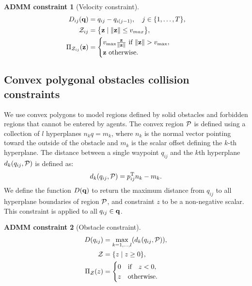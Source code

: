 \documentclass[journal]{IEEEtran}  %
\newtheorem{constraint}{ADMM constraint}
\def\sZ{\mathcal{Z}}
\begin{document}
  \begin{constraint}[Velocity constraint]
\begin{align}
     D_{ij}(\vq) &= q_{ij}-q_{i(j-1)}, \quad j\in\{1,\ldots, T\},\\
\label{eq:velocity_constraint}
   \sZ_{ij} &=\bigl\{\vz \mid \norm{\vz} \leq v_{max}\bigr\},\\
   \Pi_{\sZ_{ij}}(\vz)&=\begin{cases}
   v_{\max}\frac{\vz}{\norm{\vz}} \textrm{ if } \norm{\vz}>v_{\max},\\
   \vz\textrm{ otherwise.}
   \end{cases}
\end{align}
\end{constraint}

\subsection{Convex polygonal obstacles collision constraints} \label{sec:obstacle-constraint}

We use convex polygons to model regions defined by solid obstacles and forbidden regions that cannot be entered by agents. The convex region $\mathcal{P}$ is defined using a collection of $l$ hyperplanes $n_{k} q = m_{k}$, where $n_k$ is the normal vector pointing toward the outside of the obstacle and $m_k$ is the scalar offset defining the $k$-th hyperplane. The distance between a single waypoint $q_{ij}$ and the $k$th hyperplane $d_{k}(q_{ij},\mathcal{P})$ is defined as:
\begin{equation}
    d_{k}(q_{ij},\mathcal{P})= p_{ij}^\mathrm{T} n_k - m_k.
\end{equation}
We define the function $D(\mathbf{q})$ to return the maximum distance from $q_{ij}$ to all hyperplane boundaries of region $\mathcal{P}$, and  constraint $z$ to be a non-negative scalar. This constraint is applied to all $q_{ij} \in \mathbf{q}$. 

\begin{constraint}[Obstacle constraint]
\begin{align}
     	D(q_{ij}) &= \max_{k=1,\dots,l} (d_{k}(q_{ij},\cP)),\\
\label{eq:obstacle_constraint}
  \sZ &= \{z \mid z \geq 0 \},\\
   \Pi_\sZ(z) & = \begin{cases}
   0 & \textrm{if} \quad z < 0,\\
   z  & \textrm{otherwise.}
   \end{cases} \label{eq:zoneConstraintProjection}
\end{align}
\end{constraint}
\end{document}
